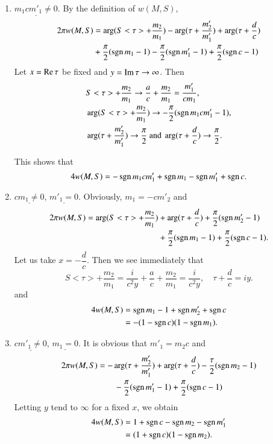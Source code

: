 \begin{enumerate}
\item $\underline{m_1 c m'_1\neq 0}$. By the definition of $w(M,S)$,
\begin{align*}
2\pi w (M,S) & = \arg(S<\tau>+\frac{m_2}{m_1})
-\arg(\tau+\frac{m'_2}{m'_1}) + \arg(\tau+\frac{d}{c})\\
& + \frac{\pi}{2}(\operatorname{sgn} m_1-1) -\frac{\pi}{2} (\operatorname{sgn} m'_1-1) +
\frac{\pi}{2} (\operatorname{sgn} c-1)
\end{align*}
Let $x=\operatorname{Re} \tau$ be fixed and $y=\operatorname{Im} \tau\to \infty$. Then
\begin{align*}
& S<\tau> + \frac{m_2}{m_1} \to \frac{a}{c}+ \frac{m_2}{m_1} =
  \frac{m'_1}{cm_1},\\
&\arg (S <\tau> + \frac{m_2}{m_1}) \to
  -\frac{\pi}{2} (\operatorname{sgn} m_1 cm'_1 -1),\\
&\arg(\tau+\frac{m'_2}{m'_1}) \to \frac{\pi}{2} \text{ and }
  \arg(\tau+\frac{d}{c}) \to \frac{\pi}{2}.
\end{align*}

This shows that
$$
4w(M,S) = -\operatorname{sgn} m_1 cm'_1 + \operatorname{sgn} m_1- \operatorname{sgn} m'_1 + \operatorname{sgn} c.
$$

\item $\underline{cm_1\neq 0}$, $\underline{m'_1=0}$. Obviously, $m_1=-cm'_2$
  and 
\begin{align*}
2\pi w (M,S) = \arg (S<\tau> + \frac{m_2}{m_1}) & +
\arg(\tau+\frac{d}{c}) + \frac{\pi}{2} (\operatorname{sgn} m'_2-1) \\
& + \frac{\pi}{2} (\operatorname{sgn} m_1-1) +\frac{\pi}{2}(\operatorname{sgn} c-1).
\end{align*}
Let us take $x=-\dfrac{d}{c}$. Then we see immediately that
$$
S<\tau> + \frac{m_2}{m_1} = \frac{i}{c^2y} + \frac{a}{c} +
\frac{m_2}{m_1} = \frac{i}{c^2y}, \quad \tau + \frac{d}{c} = iy. 
$$
and
\begin{align*}
4w(M,S) & = \operatorname{sgn} m_1-1 + \operatorname{sgn} m'_2 + \operatorname{sgn} c\\
& = -(1-\operatorname{sgn} c) (1-\operatorname{sgn} m_1).
\end{align*}

\item $\underline{cm'_1\neq0}$, $\underline{m_1=0}$. It is obvious that
  $m'_1=m_2c$ and 
\begin{align*}
2\pi w (M,S) & = -\arg(\tau + \frac{m'_2}{m'_1}) +
\arg(\tau+\frac{d}{c}) - \frac{\tau}{2}(\operatorname{sgn} m_2-1)\\
& \qquad -\frac{\pi}{2} (\operatorname{sgn} m'_1-1) + \frac{\pi}{2} (\operatorname{sgn} c-1)
\end{align*}\pageoriginale
Letting $y$ tend to $\infty$ for a fixed $x$, we obtain 
\begin{align*}
4w(M,S) & = 1 + \operatorname{sgn} c-\operatorname{sgn} m_2 - \operatorname{sgn} m'_1\\
& = (1+\operatorname{sgn} c)(1-\operatorname{sgn} m_2).
\end{align*}


\end{enumerate}
